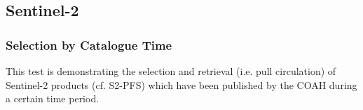 \documentclass[dec_sum_main.tex]{subfiles}
\begin{document}
\subsection{Sentinel-2}


\subsubsection{Selection by Catalogue Time}
This test is demonstrating the selection and retrieval (i.e. pull circulation) of Sentinel-2 products (cf. S2-PFS) which have been published by the COAH during a certain time period. \newline

 \newline
\end{document}
